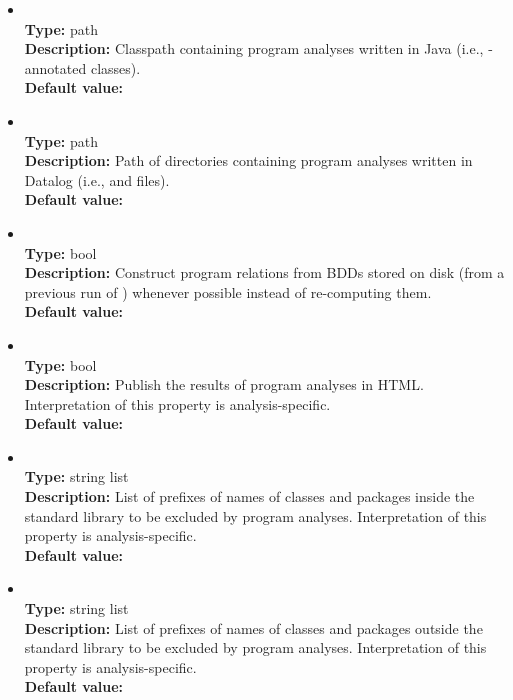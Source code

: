 \begin{itemize}
\item
{} \\
{\bf Type:} path \\
{\bf Description:} Classpath containing program analyses written in Java (i.e., -annotated classes). \\
{\bf Default value:}  

\item
{} \\
{\bf Type:} path \\
{\bf Description:} Path of directories containing program analyses written in Datalog (i.e.,  and  files). \\
{\bf Default value:}  

\item
{} \\
{\bf Type:} bool \\
{\bf Description:} Construct program relations from BDDs stored on disk (from a previous run of \Chord) whenever possible instead of re-computing them. \\
{\bf Default value:}  

\item
{} \\
{\bf Type:} bool \\
{\bf Description:} Publish the results of program analyses in HTML.  Interpretation of this property is analysis-specific. \\
{\bf Default value:}  

\item
{} \\
{\bf Type:} string list \\
{\bf Description:} List of prefixes of names of classes and packages inside the standard library to be excluded by program analyses.  Interpretation of this property is analysis-specific. \\
{\bf Default value:}  

\item
{} \\
{\bf Type:} string list \\
{\bf Description:} List of prefixes of names of classes and packages outside the standard library to be excluded by program analyses.  Interpretation of this property is analysis-specific. \\
{\bf Default value:} 


\end{itemize}
